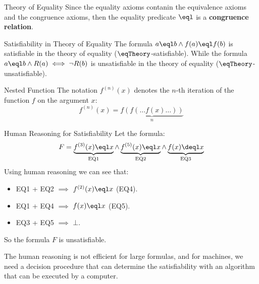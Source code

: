 \begin{remark}{Theory of Equality}
    Since the equality axioms contanin the equivalence axioms and 
    the congruence axioms, then the equality predicate $\eql$ is
    a \textbf{congruence relation}.
\end{remark}

\begin{example}{Satisfiability in Theory of Equality}
    The formula $a \eql b \land f(a) \eql f(b)$ is
    satisfiable in the theory of equality ($\eqTheory$-satisfiable).
    While the formula $a \eql b \land R(a) \iff \neg R(b)$ is
    unsatisfiable in the theory of equality
    ($\eqTheory$-unsatisfiable).
\end{example}

\begin{notation}{Nested Function}
    The notation $f^{(n)}(x)$ denotes the 
    $n$-th iteration of the function $f$ on the argument $x$:
    \begin{equation*}
        f^{(n)}(x) = \underbrace{f(f(\dots f(x) \dots))}_{n}
    \end{equation*}
\end{notation}

\begin{example}{Human Reasoning for Satisfiability}
    Let the formula:
    \begin{equation*}
        F = \underbrace{f^{(3)}(x) \eql x}_{\text{EQ1}} \land
        \underbrace{f^{(5)}(x) \eql x}_{\text{EQ2}} \land 
        \underbrace{f(x) \deql x}_{\text{EQ3}}
    \end{equation*}
    Using human reasoning we can see that:
    \begin{itemize}
        \item EQ1 + EQ2 $\implies$ $f^{(2)}(x) \eql x$ (EQ4).
        \item EQ1 + EQ4 $\implies$ $f(x) \eql x$ (EQ5).
        \item EQ3 + EQ5 $\implies$ $\bot$.
    \end{itemize}
    So the formula $F$ is unsatisfiable.
\end{example}

The human reasoning is not efficient for large formulas, and 
for machines, we need a decision procedure that can determine
the satisfiability with an algorithm that can be executed by a computer.
